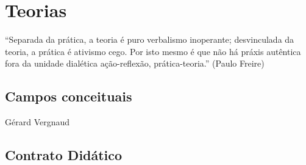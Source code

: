 \chapter{Teorias}

“Separada da prática, a teoria é puro verbalismo inoperante; desvinculada da teoria, a prática é ativismo cego. Por isto mesmo é que não há práxis autêntica fora da unidade dialética ação-reflexão, prática-teoria.” (Paulo Freire)

\section{Campos conceituais}
Gérard Vergnaud

\section{Contrato Didático}

